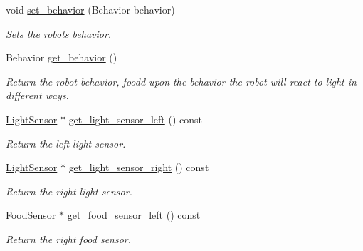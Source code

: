 \begin{DoxyCompactItemize}
\mbox{\label{class_robot_a464e8c93ec1ed8e632285c5d51777bc0}} 
void \mbox{\hyperlink{class_robot_a464e8c93ec1ed8e632285c5d51777bc0}{set\+\_\+behavior}} (Behavior behavior)
\begin{DoxyCompactList}\small\item\em Sets the robot\textquotesingle{}s behavior. \end{DoxyCompactList}\item 
\mbox{\label{class_robot_a1277018a7a7b38353141971833367d21}} 
Behavior \mbox{\hyperlink{class_robot_a1277018a7a7b38353141971833367d21}{get\+\_\+behavior}} ()
\begin{DoxyCompactList}\small\item\em Return the robot behavior, foodd upon the behavior the robot will react to light in different ways. \end{DoxyCompactList}\item 
\mbox{\label{class_robot_a11f677bb307f6b94846e5e463a1ddba2}} 
\mbox{\hyperlink{class_light_sensor}{Light\+Sensor}} $\ast$ \mbox{\hyperlink{class_robot_a11f677bb307f6b94846e5e463a1ddba2}{get\+\_\+light\+\_\+sensor\+\_\+left}} () const
\begin{DoxyCompactList}\small\item\em Return the left light sensor. \end{DoxyCompactList}\item 
\mbox{\label{class_robot_a8513b9257593c5191f776f7401b92ff3}} 
\mbox{\hyperlink{class_light_sensor}{Light\+Sensor}} $\ast$ \mbox{\hyperlink{class_robot_a8513b9257593c5191f776f7401b92ff3}{get\+\_\+light\+\_\+sensor\+\_\+right}} () const
\begin{DoxyCompactList}\small\item\em Return the right light sensor. \end{DoxyCompactList}\item 
\mbox{\label{class_robot_a0f3fb5482ce76b0c369870440df2766b}} 
\mbox{\hyperlink{class_food_sensor}{Food\+Sensor}} $\ast$ \mbox{\hyperlink{class_robot_a0f3fb5482ce76b0c369870440df2766b}{get\+\_\+food\+\_\+sensor\+\_\+left}} () const
\begin{DoxyCompactList}\small\item\em Return the right food sensor. \end{DoxyCompactList}\item 

\end{DoxyCompactItemize}
